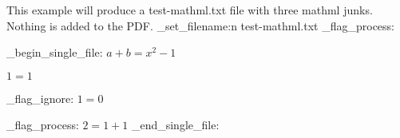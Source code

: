 \documentclass{article}
\begin{document}
This example will produce a test-mathml.txt file with three mathml junks.
Nothing is added to the PDF.
\ExplSyntaxOn
\luamml_set_filename:n {test-mathml.txt}
\luamml_flag_process: 

\luamml_begin_single_file:
\ExplSyntaxOff
$a+b=x^2 -1 $

$1=1$

\ExplSyntaxOn
\luamml_flag_ignore: 
$1=0$

\luamml_flag_process: 
$ 2=1+1 $
\luamml_end_single_file:
\ExplSyntaxOff
\end{document}
